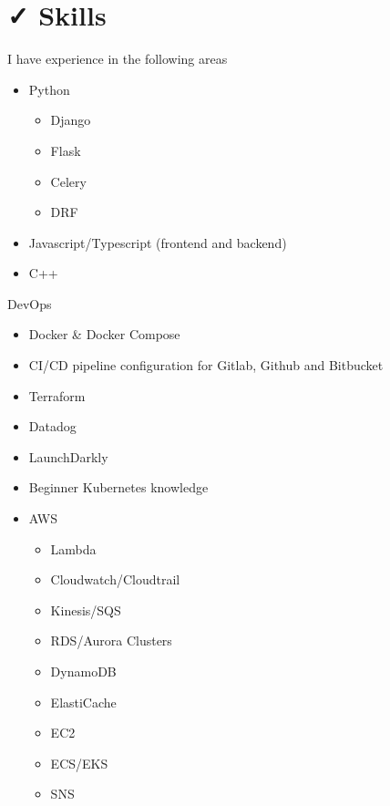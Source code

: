 \documentclass{resume}
\begin{document}
\section{{\faCheck} Skills}
I have experience in the following areas \\
\bigskip
\begin{minipage}[t]{0.3\textwidth}
  \begin{itemize}
    \item Python
    \begin{itemize}
      \item Django
      \item Flask
      \item Celery
      \item DRF
    \end{itemize}
    \item Javascript/Typescript (frontend and backend)
    \item C++
  \end{itemize}
\end{minipage}
\begin{minipage}[t]{0.3\textwidth}
    \item DevOps
    \begin{itemize}
      \item Docker \& Docker Compose
      \item CI/CD pipeline configuration for Gitlab, Github and Bitbucket
      \item Terraform
      \item Datadog
      \item LaunchDarkly
      \item Beginner Kubernetes knowledge
  \end{itemize}
\end{minipage}
\begin{minipage}[t]{0.3\textwidth}
  \begin{itemize}
    \item AWS
    \begin{itemize}
      \item Lambda
      \item Cloudwatch/Cloudtrail
      \item Kinesis/SQS
      \item RDS/Aurora Clusters
      \item DynamoDB
      \item ElastiCache
      \item EC2
      \item ECS/EKS
      \item SNS
    \end{itemize}
  \end{itemize}
\end{minipage}
\end{document}
